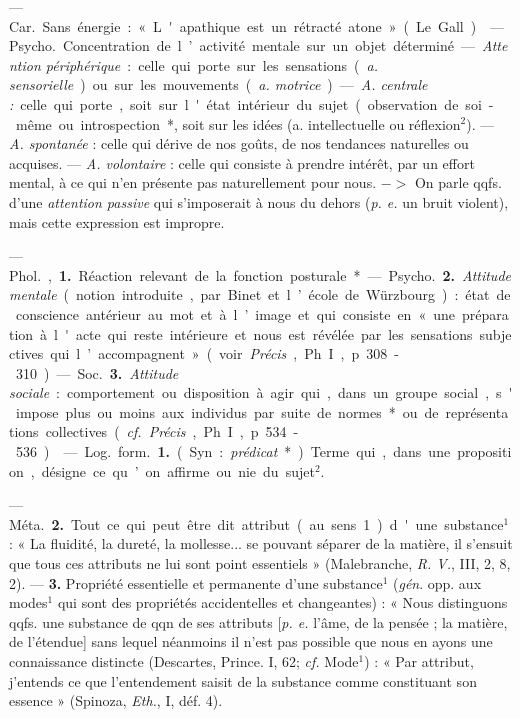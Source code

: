 \begin{itemize}[leftmargin=1cm, label=, itemsep=1pt]
{ — \si{Car.} Sans énergie : « L'apathique est un rétracté atone »
(Le Gall).

 — \si{Psycho.} Concentration
de l’activité mentale sur un objet
déterminé. — {\it Attention périphérique} : celle qui porte sur les sensations
({\it a. sensorielle}) ou sur les mouvements ({\it a. motrice}). — {\it A. centrale :}
celle qui porte, soit sur l'état intérieur du sujet (observation de
soi-même ou introspection*}, soit sur les
idées (a. intellectuelle ou réflexion$^2$).
— {\it A. spontanée} : celle qui dérive de
nos goûts, de nos tendances naturelles ou acquises. — {\it A. volontaire} :
celle qui consiste à prendre intérêt,
par un effort mental, à ce qui n’en
présente pas naturellement pour
nous. $->$ On parle qqfs. d’une
{\it attention passive} qui s'imposerait à
nous du dehors ({\it p. e.} un bruit violent),
mais cette expression est impropre.

 — \si{Phol.}, {\bf 1.} Réaction relevant de la fonction posturale*.

— \si{Psycho.} {\bf 2.} {\it Attitude mentale}
(notion introduite, par Binet et
l’école de Würzbourg) : état de conscience antérieur au mot et à l’image
et qui consiste en « une préparation
à l'acte qui reste intérieure et nous
est révélée par les sensations subjectives qui l’accompagnent » (voir
{\it Précis}, Ph. I, p. 308-310).

— \si{Soc.} {\bf 3.} {\it Attitude sociale} : comportement ou disposition à agir qui,
dans un groupe social, s'impose plus
ou moins aux individus par suite de
normes* ou de représentations collectives ({\it cf.}  {\it Précis}, Ph. I, p. 534-536).

 — \si{Log.} \si{form.} {\bf 1.} (Syn. : {\it prédicat}*). Terme qui, dans
une proposition, désigne ce qu’on affirme
ou nie du sujet$^2$.

— \si{Méta.} {\bf 2.} Tout ce qui peut être
dit attribut (au sens 1) d'une substance$^1$ : « La fluidité, la dureté, la
mollesse... se pouvant séparer de la
matière, il s'ensuit que tous ces
attributs ne lui sont point essentiels » (Malebranche, {\it R. V.}, III, 2,
8, 2). — {\bf 3.} Propriété essentielle et
permanente d’une substance$^1$ ({\it gén}.
opp. aux modes$^1$ qui sont des propriétés accidentelles et changeantes) :
« Nous distinguons qqfs. une substance de qqn de ses attributs [{\it p. e.}
l'âme, de la pensée ; la matière, de
l'étendue] sans lequel néanmoins il
n’est pas possible que nous en ayons
une connaissance distincte (Descartes, Prince. I, 62; {\it cf.}  Mode$^1$) :
« Par attribut, j'entends ce que
l’entendement saisit de la substance
comme constituant son essence »
(Spinoza, {\it Eth.}, I, déf. 4).


\end{itemize}
